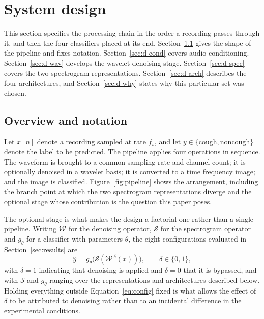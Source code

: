 \documentclass[pdflatex,sn-mathphys-num]{sn-jnl}
\begin{document}
\section{System design}\label{sec:design}

This section specifies the processing chain in the order a recording passes
through it, and then the four classifiers placed at its end.
Section~\ref{sec:d-overview} gives the shape of the pipeline and fixes
notation. Section~\ref{sec:d-cond} covers audio conditioning.
Section~\ref{sec:d-wav} develops the wavelet denoising stage.
Section~\ref{sec:d-spec} covers the two spectrogram representations.
Section~\ref{sec:d-arch} describes the four architectures, and
Section~\ref{sec:d-why} states why this particular set was chosen.

\subsection{Overview and notation}\label{sec:d-overview}

Let $x[n]$ denote a recording sampled at rate $f_s$, and let
$y \in \{\text{cough}, \text{noncough}\}$ denote the label to be predicted.
The pipeline applies four operations in sequence. The waveform is brought to a
common sampling rate and channel count; it is optionally denoised in a wavelet
basis; it is converted to a time frequency image; and the image is classified.
Figure~\ref{fig:pipeline} shows the arrangement, including the branch point at
which the two spectrogram representations diverge and the optional stage whose
contribution is the question this paper poses.

The optional stage is what makes the design a factorial one rather than a
single pipeline. Writing $\mathcal{W}$ for the denoising operator,
$\mathcal{S}$ for the spectrogram operator and $g_\theta$ for a classifier
with parameters $\theta$, the eight configurations evaluated in
Section~\ref{sec:results} are
\begin{equation}
\hat{y} = g_\theta\big(\mathcal{S}(\mathcal{W}^{\,\delta}(x))\big),
\qquad \delta \in \{0, 1\},
\label{eq:config}
\end{equation}
with $\delta = 1$ indicating that denoising is applied and $\delta = 0$ that
it is bypassed, and with $\mathcal{S}$ and $g_\theta$ ranging over the
representations and architectures described below. Holding everything outside
Equation~\eqref{eq:config} fixed is what allows the effect of $\delta$ to be
attributed to denoising rather than to an incidental difference in the
experimental conditions.
\end{document}
